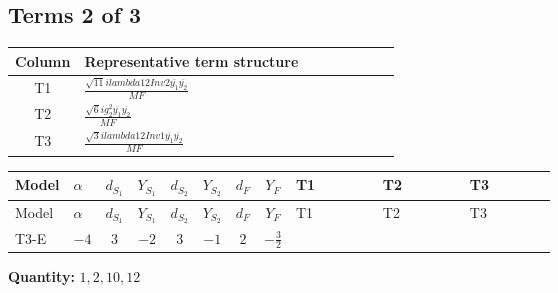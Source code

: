 \documentclass[8pt]{article}
\begin{document}
\begin{landscape}
\subsection*{Terms 2 of 3}
\begin{center}
\begin{tabular}{@{}c >{\raggedright\arraybackslash}p{0.82\linewidth}@{}}
\toprule
Column & Representative term structure \\
\midrule
T1 & \(\displaystyle \frac{\sqrt{11} i lambda12Inv2 \overline{y_{1}} \overline{y_{2}}}{MF}\) \\
\midrule
T2 & \(\displaystyle \frac{\sqrt{6} i g_{2}^{2} \overline{y_{1}} \overline{y_{2}}}{MF}\) \\
\midrule
T3 & \(\displaystyle \frac{\sqrt{3} i lambda12Inv1 \overline{y_{1}} \overline{y_{2}}}{MF}\) \\
\midrule
\bottomrule
\end{tabular}
\end{center}
\smallskip
\tiny
\begin{longtable}{@{}llcccccc >{\raggedright\arraybackslash}p{0.21\linewidth} >{\raggedright\arraybackslash}p{0.21\linewidth} >{\raggedright\arraybackslash}p{0.21\linewidth}@{}}
\toprule
Model & $\alpha$ & $d_{S_1}$ & $Y_{S_1}$ & $d_{S_2}$ & $Y_{S_2}$ & $d_F$ & $Y_F$ & T1 & T2 & T3 \\
\midrule
\endfirsthead
\toprule
Model & $\alpha$ & $d_{S_1}$ & $Y_{S_1}$ & $d_{S_2}$ & $Y_{S_2}$ & $d_F$ & $Y_F$ & T1 & T2 & T3 \\
\midrule
\endhead
T3-E & $-4$ & $3$ & $-2$ & $3$ & $-1$ & $2$ & $-\frac{3}{2}$ & \scriptsize\adjustbox{max width=\linewidth}{$\begin{gathered} - \frac{3 \sqrt{11} i lambda12Inv2 \overline{y_{1}} \overline{y_{2}}}{22 MF}\end{gathered}$} & \scriptsize\adjustbox{max width=\linewidth}{$\begin{gathered} - \frac{\sqrt{6} i g_{2}^{2} \overline{y_{1}} \overline{y_{2}}}{6 MF}\end{gathered}$} & \scriptsize\adjustbox{max width=\linewidth}{$\begin{gathered} \frac{\sqrt{3} i lambda12Inv1 \overline{y_{1}} \overline{y_{2}}}{6 MF}\end{gathered}$} \\
\midrule
\bottomrule
\end{longtable}
\clearpage
\noindent\textbf{Quantity: }$\mathrm{1,2,10,12}$\par\smallskip

\end{landscape}
\end{document}
